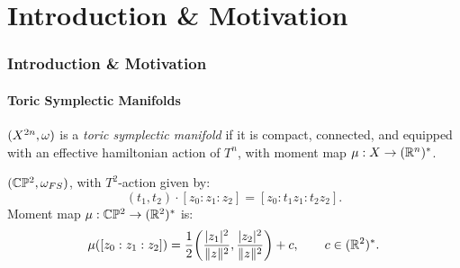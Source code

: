 \section[]{Introduction \& Motivation}

\begin{frame}
\frametitle{Introduction \& Motivation}
\framesubtitle{Toric Symplectic Manifolds}

\begin{defn}
	$(X^{2n}, \omega)$ is a \emph{toric symplectic manifold} if it is compact, connected, and equipped with an effective hamiltonian action of $T^{n}$, with moment map $\mu:X \rightarrow (\mathbb{R}^{n})^{\ast}$.
\end{defn}

\begin{ex}
	$(\mathbb{C}\mathbb{P}^{2}, \omega_{FS})$, with $T^{2}$-action given by:
	$$
		(t_{1},t_{2})\cdot [z_{0}: z_{1}: z_{2}] = [z_{0}: t_{1}z_{1}: t_{2}z_{2}].
	$$
	Moment map $\mu:\mathbb{C}\mathbb{P}^{2} \rightarrow (\mathbb{R}^{2})^{\ast}$ is:
	$$
		\mu([z_{0}:z_{1}:z_{2}]) = \frac{1}{2}\bigg( \frac{|z_{1}|^{2}}{\|z\|^{2}}, \frac{|z_{2}|^{2}}{\|z\|^{2}}   \bigg) + c,\qquad c \in (\mathbb{R}^{2})^{\ast}.
	$$
\end{ex}

\end{frame}


